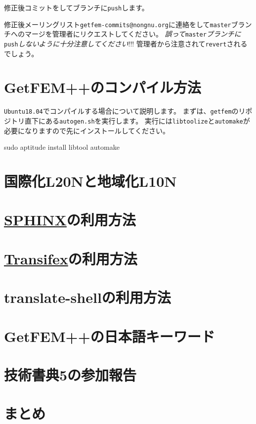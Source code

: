 \documentclass{../../style/ltjoc}
\begin{document}
修正後コミットをしてブランチに\texttt{push}します。
\begin{shbox}
\end{shbox}
修正後メーリングリスト\texttt{getfem-commits@nongnu.org}に連絡をして\texttt{master}ブランチへのマージを管理者にリクエストしてください。
\emph{誤って}\texttt{master}\emph{ブランチに}\texttt{push}\emph{しないように十分注意してください}!!!
管理者から注意されて\texttt{revert}されるでしょう。

\section{GetFEM++のコンパイル方法}
\texttt{Ubuntu18.04}でコンパイルする場合について説明します。
まずは、\texttt{getfem}のリポジトリ直下にある\texttt{autogen.sh}を実行します。
実行には\texttt{libtoolize}と\texttt{automake}が必要になりますので先にインストールしてください。
\begin{shbox}
  \shline{} {sudo aptitude install libtool automake}
\end{shbox}

\section{国際化L20Nと地域化L10N}
\section{\href{http://www.sphinx-doc.org/en/master}{SPHINX}の利用方法}
\section{\href{https://www.transifex.com}{Transifex}の利用方法}
\section{translate-shellの利用方法}
\section{GetFEM++の日本語キーワード}
\section{技術書典5の参加報告}
\section{まとめ}
\end{document}
